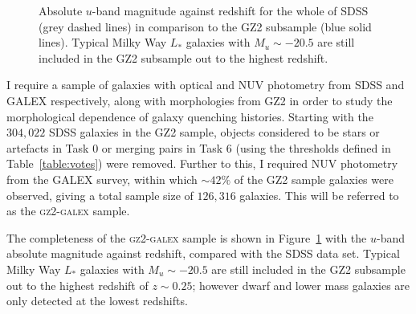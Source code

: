 \begin{figure}[t]
\caption[GZ2-GALEX sample completeness]{Absolute $u$-band magnitude against redshift for the whole of SDSS (grey dashed lines) in comparison to the GZ2 subsample (blue solid lines). Typical Milky Way $L_*$ galaxies with $M_u \sim -20.5$ are still included in the GZ2 subsample out to the highest redshift.}
\label{complete}
\end{figure}


I require a sample of galaxies with optical and NUV photometry from SDSS and GALEX respectively, along with morphologies from GZ2 in order to study the morphological dependence of galaxy quenching histories. Starting with the $304,022$ SDSS galaxies in the GZ2 sample, objects considered to be stars or artefacts in Task 0 or merging pairs in Task 6 (using the thresholds defined in Table~\ref{table:votes}) were removed. Further to this, I required NUV photometry from the GALEX survey, within which $\sim42\%$ of the GZ2 sample galaxies were observed, giving a total sample size of $126, 316$ galaxies. This will be referred to as the \textsc{gz2-galex} sample. 

The completeness of the \textsc{gz2-galex} sample is shown in Figure~\ref{complete} with the $u$-band absolute magnitude against redshift, compared with the SDSS data set. Typical Milky Way $L_*$ galaxies with $M_u \sim -20.5$ are still included in the GZ2 subsample out to the highest redshift of $z \sim 0.25$; however dwarf and lower mass galaxies are only detected at the lowest redshifts.

